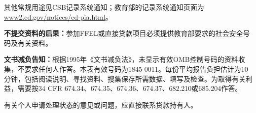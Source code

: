 \documentclass[UTF8,fontset=none,11pt,a4paper]{ctexart}
\begin{document}
其他常规用途见CSB记录系统通知；教育部的记录系统通知页面为\url{www2.ed.gov/notices/ed-pia.html}。


\textbf{不提交资料的后果：}参加FFEL或直接贷款项目必须提供教育部要求的社会安全号码及有关资料。


\textbf{文书减负告知：}根据1995年《文书减负法》，未显示有效OMB控制号码的资料收集，不要求任何人作答。本表有效号码为1845-0011。每份平均报告负担估计为10分钟，包括阅读说明、寻找资料、搜集保存所需数据、填写及检查。为取得有关利益，需要按34 CFR 674.34、674.35、674.36、674.37、682.210或685.204作答。


有关个人申请处理状态的意见或问题，应直接联系贷款持有人。
\end{document}
